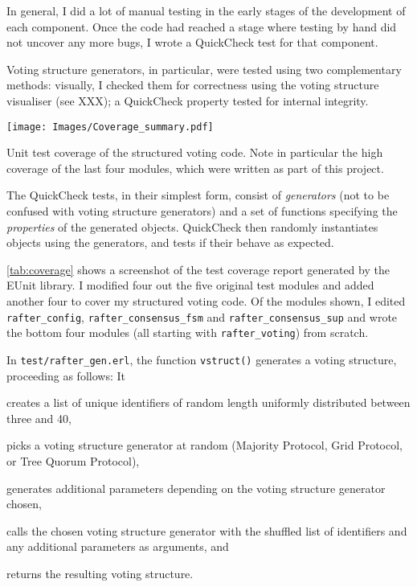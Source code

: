 \documentclass[11pt,chapterprefix=true,toc=bibliography,numbers=noendperiod,
               footnotes=multiple,twoside]{scrreprt}
\begin{document}
In general, I did a lot of manual testing in the early stages of the development of each component. Once the code had reached a stage where testing by hand did not uncover any more bugs, I wrote a QuickCheck test for that component.

Voting structure generators, in particular, were tested using two complementary methods: visually, I checked them for correctness using the voting structure visualiser (see XXX); a QuickCheck property tested for internal integrity.

\begin{table}[h]
    \centering
    \texttt{[image: Images/Coverage\_summary.pdf]}
    \caption[Unit test coverage]{Unit test coverage of the structured voting code. Note in particular the high coverage of the last four modules, which were written as part of this project.}
    \label{tab:coverage}
\end{table}

The QuickCheck tests, in their simplest form, consist of \emph{generators} (not to be confused with voting structure generators) and a set of functions specifying the \emph{properties} of the generated objects. QuickCheck then randomly instantiates objects using the generators, and tests if their behave as expected.

\autoref{tab:coverage} shows a screenshot of the test coverage report generated by the EUnit library. I modified four out the five original test modules and added another four to cover my structured voting code. Of the modules shown, I edited \texttt{rafter\_config}, \texttt{rafter\_consensus\_fsm} and \texttt{rafter\_consensus\_sup} and wrote the bottom four modules (all starting with \texttt{rafter\_voting}) from scratch.


In \texttt{test/rafter\_gen.erl}, the function \texttt{vstruct()} generates a voting structure, proceeding as follows: It
\begin{inparaenum}[(a)]
    \item creates a list of unique identifiers of random length uniformly distributed between three and 40,
    \item picks a voting structure generator at random (Majority Protocol, Grid Protocol, or Tree Quorum Protocol),
    \item generates additional parameters depending on the voting structure generator chosen,
    \item calls the chosen voting structure generator with the shuffled list of identifiers and any additional parameters as arguments, and
    \item returns the resulting voting structure.
\end{inparaenum}
\end{document}
